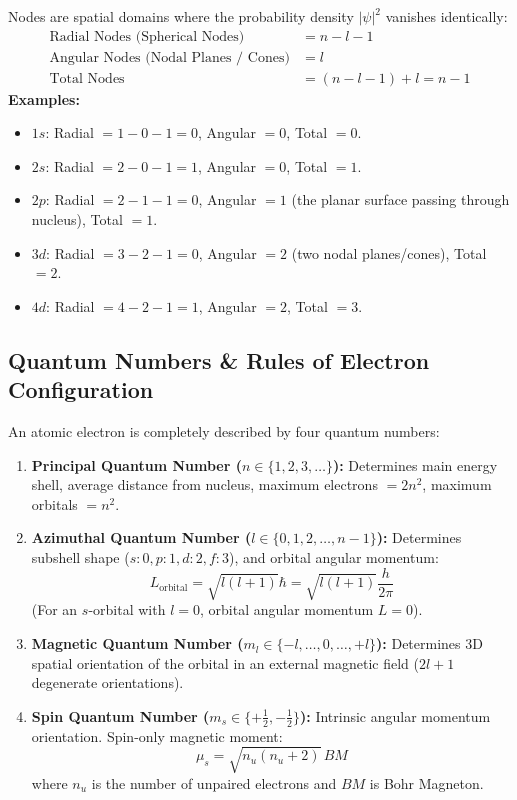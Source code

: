\documentclass[10pt,twoside,openright]{book}
\begin{document}
\begin{formulabox}
Nodes are spatial domains where the probability density $|\psi|^2$ vanishes identically:
\begin{align}
  \text{Radial Nodes (Spherical Nodes)} &= n - l - 1 \\
  \text{Angular Nodes (Nodal Planes / Cones)} &= l \\
  \text{Total Nodes} &= (n - l - 1) + l = n - 1
\end{align}
\textbf{Examples:}
\begin{itemize}
  \item $1s$: Radial $= 1 - 0 - 1 = 0$, Angular $= 0$, Total $= 0$.
  \item $2s$: Radial $= 2 - 0 - 1 = 1$, Angular $= 0$, Total $= 1$.
  \item $2p$: Radial $= 2 - 1 - 1 = 0$, Angular $= 1$ (the planar surface passing through nucleus), Total $= 1$.
  \item $3d$: Radial $= 3 - 2 - 1 = 0$, Angular $= 2$ (two nodal planes/cones), Total $= 2$.
  \item $4d$: Radial $= 4 - 2 - 1 = 1$, Angular $= 2$, Total $= 3$.
\end{itemize}
\end{formulabox}

\subsection{Quantum Numbers \& Rules of Electron Configuration}
An atomic electron is completely described by four quantum numbers:
\begin{enumerate}
  \item \textbf{Principal Quantum Number ($n \in \{1, 2, 3, \dots\}$):} Determines main energy shell, average distance from nucleus, maximum electrons $= 2n^2$, maximum orbitals $= n^2$.
  \item \textbf{Azimuthal Quantum Number ($l \in \{0, 1, 2, \dots, n-1\}$):} Determines subshell shape ($s: 0, p: 1, d: 2, f: 3$), and orbital angular momentum:
  \begin{equation}
    L_{\text{orbital}} = \sqrt{l(l+1)}\hbar = \sqrt{l(l+1)}\frac{h}{2\pi}
  \end{equation}
  (For an $s$-orbital with $l=0$, orbital angular momentum $L=0$).
  \item \textbf{Magnetic Quantum Number ($m_l \in \{-l, \dots, 0, \dots, +l\}$):} Determines 3D spatial orientation of the orbital in an external magnetic field ($2l+1$ degenerate orientations).
  \item \textbf{Spin Quantum Number ($m_s \in \{+\frac{1}{2}, -\frac{1}{2}\}$):} Intrinsic angular momentum orientation. Spin-only magnetic moment:
  \begin{equation}
    \mu_s = \sqrt{n_u(n_u + 2)}\,\si{BM}
  \end{equation}
  where $n_u$ is the number of unpaired electrons and $\si{BM}$ is Bohr Magneton.
\end{enumerate}
\end{document}

